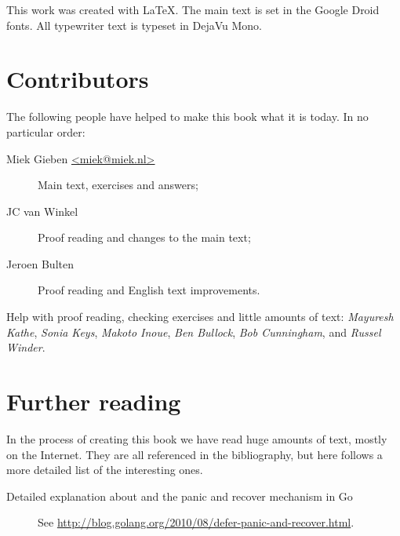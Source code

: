 \noindent{}This work was created with \LaTeX. The main text is set in
the Google Droid fonts. All typewriter text is typeset in DejaVu Mono.

\section{Contributors}
The following people have helped to make this book what it is today.
In no particular order:
\begin{description}
\item[Miek Gieben \qquad\url{<miek@miek.nl>}] 
{Main text, exercises and answers;}
\item[JC van Winkel]
{Proof reading and changes to the main text;}
\item[Jeroen Bulten]
{Proof reading and English text improvements.}
\end{description}

Help with proof reading, checking exercises and little amounts of text:
\emph{Mayuresh Kathe},
\emph{Sonia Keys},
\emph{Makoto Inoue},
\emph{Ben Bullock},
\emph{Bob Cunningham},
and \emph{Russel Winder}.

\section{Further reading}
In the process of creating this book we have read huge amounts of text,
mostly on the Internet. They are all referenced in the bibliography, but
here follows a more detailed list of the interesting ones.
\begin{description}
\item[Detailed explanation about  and the panic and recover
mechanism in Go]{See 
\url{http://blog.golang.org/2010/08/defer-panic-and-recover.html}.}
\end{description}
